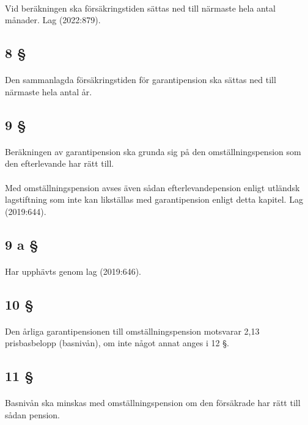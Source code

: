 \documentclass[a4paper,notitlepage,openany,10pt]{book}
\begin{document}
\paragraph*{}
Vid beräkningen ska försäkringstiden sättas ned till närmaste hela antal månader.
Lag (2022:879).
\subsection*{8 §}
\paragraph*{}
Den sammanlagda försäkringstiden för garantipension ska sättas ned till närmaste hela antal år.
\subsection*{9 §}
\paragraph*{}
Beräkningen av garantipension ska grunda sig på den omställningspension som den efterlevande har rätt till.
\paragraph*{}
Med omställningspension avses även sådan efterlevandepension enligt utländsk lagstiftning som inte kan likställas med garantipension enligt detta kapitel.
Lag (2019:644).
\subsection*{9 a §}
\paragraph*{}
Har upphävts genom
lag (2019:646).
\subsection*{10 §}
\paragraph*{}
Den årliga garantipensionen till omställningspension motsvarar 2,13 prisbasbelopp (basnivån), om inte något annat anges i 12 §.
\subsection*{11 §}
\paragraph*{}
Basnivån ska minskas med omställningspension om den försäkrade har rätt till sådan pension.
\end{document}
